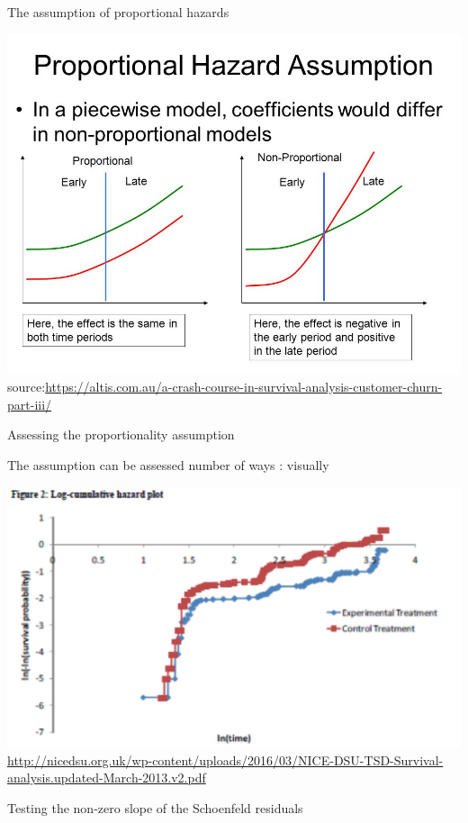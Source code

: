 \documentclass[
  ignorenonframetext,
]{beamer}
\begin{document}
\begin{frame}{The assumption of proportional hazards}
\protect\hypertarget{the-assumption-of-proportional-hazards}{}

\includegraphics[width=1\linewidth]{figures/Churn}
source:\url{https://altis.com.au/a-crash-course-in-survival-analysis-customer-churn-part-iii/}

\end{frame}

\begin{frame}{Assessing the proportionality assumption}
\protect\hypertarget{assessing-the-proportionality-assumption}{}

The assumption can be assessed number of ways : visually

\includegraphics[width=1\linewidth]{figures/prop}
\url{http://nicedsu.org.uk/wp-content/uploads/2016/03/NICE-DSU-TSD-Survival-analysis.updated-March-2013.v2.pdf}

Testing the non-zero slope of the Schoenfeld residuals

\end{frame}
\end{document}
